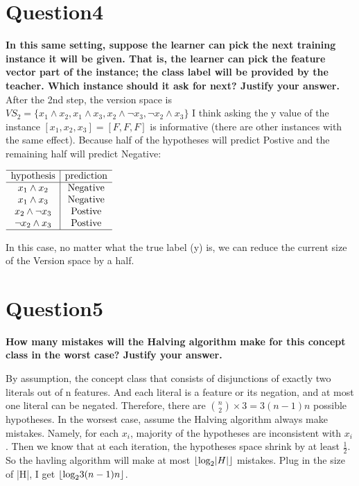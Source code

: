 \documentclass[paper=a4, fontsize=11pt]{scrartcl} %
\DeclarePairedDelimiter\floor{\lfloor}{\rfloor}
\numberwithin{equation}{section} %
\numberwithin{figure}{section} %
\numberwithin{table}{section} %
\begin{document}
\newpage
\section*{Question4}
\textbf{In this same setting, suppose the learner can pick the next training instance it will be given. That is, the learner can pick the feature vector part of the instance; the class label will be provided by the teacher. Which instance should it ask for next? Justify your answer.}
\bigbreak 
After the 2nd step, the version space is $VS_2 = 
\{
x_1 \land x_2, x_1 \land x_3, 
x_2 \land \neg x_3,
\neg x_2 \land x_3
\}$
\smallbreak
I think asking the y value of the instance $[x_1,x_2,x_3] = [F,F,F]$ is informative (there are other instances with the same effect). Because half of the hypotheses will predict Postive and the remaining half will predict Negative:  

\begin{center}
$
\begin{array}{c|c}
\hline
\text{hypothesis} & \text{prediction} \\
\hline
x_1 \land x_2 & \text{Negative} \\ 
x_1 \land x_3 & \text{Negative}  \\ 
x_2 \land \neg x_3 & \text{Postive} \\ 
\neg x_2 \land x_3 & \text{Postive}  \\ 
\hline
\end{array}
$
\end{center}

In this case, no matter what the true label (y) is, we can reduce the current size of the Version space by a half. 

\newpage
\section*{Question5}
\textbf{How many mistakes will the Halving algorithm make for this concept class in the worst case? Justify your answer.}
\bigbreak 


By assumption, the concept class that consists of disjunctions of exactly two literals out of n features. And each literal is a feature or its negation, and at most one literal can be negated. Therefore, there are 
$
{{n}\choose{2}} \times 3 = 3(n-1)n
$
possible hypotheses. 
\smallbreak
In the worsest case, assume the Halving algorithm always make mistakes. Namely, for each $x_i$, majority of the hypotheses are inconsistent with $x_i$. Then we know that at each iteration, the hypotheses space shrink by at least $\frac{1}{2}$. So the havling algorithm will make at most  $\floor*{\text{log}_2 |H|}$ mistakes. Plug in the size of |H|, I get $\floor*{\text{log}_2 3(n-1)n}$. 
\bigbreak
\end{document}
